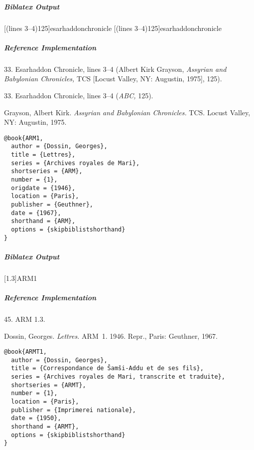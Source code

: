 \documentclass[a4paper]{article}
\newenvironment{biboutput}{%
  \subparagraph{Biblatex Output}
}{\color{black}}
\newenvironment{refimp}{%
  \subparagraph{Reference Implementation}
  \color{reference-colour}
  \rm
}{\par\color{black}}
\begin{document}
\begin{biboutput}
  [(lines 3--4)125]{esarhaddonchronicle}
  [(lines 3--4)125]{esarhaddonchronicle}
\end{biboutput}

\begin{refimp}
  \hspace*{\bibindent}33. Esarhaddon Chronicle, lines 3–4 (Albert Kirk
  Grayson, \emph{Assyrian and Babylonian Chronicles,} TCS [Locust Valley, NY:
  Augustin, 1975], 125).

  \hspace*{\bibindent}33. Esarhaddon Chronicle, lines 3–4 (\emph{ABC,} 125).

  \hangindent\bibindent Grayson, Albert Kirk. \emph{Assyrian and Babylonian
  Chronicles.} TCS. Locust Valley, NY: Augustin, 1975.


\end{refimp}

\medskip

\begin{lstlisting}
@book{ARM1,
  author = {Dossin, Georges},
  title = {Lettres},
  series = {Archives royales de Mari},
  shortseries = {ARM},
  number = {1},
  origdate = {1946},
  location = {Paris},
  publisher = {Geuthner},
  date = {1967},
  shorthand = {ARM},
  options = {skipbiblistshorthand}
}
\end{lstlisting}

\begin{biboutput}
  [1.3]{ARM1}
\end{biboutput}

\begin{refimp}
  \hspace*{\bibindent}45. ARM 1.3.

  \hangindent\bibindent Dossin, Georges. \emph{Lettres.} ARM~1. 1946. Repr.,
  Paris: Geuthner, 1967.

\end{refimp}

\medskip

\begin{lstlisting}
@book{ARMT1,
  author = {Dossin, Georges},
  title = {Correspondance de Šamši-Addu et de ses fils},
  series = {Archives royales de Mari, transcrite et traduite},
  shortseries = {ARMT},
  number = {1},
  location = {Paris},
  publisher = {Imprimerei nationale},
  date = {1950},
  shorthand = {ARMT},
  options = {skipbiblistshorthand}
}
\end{lstlisting}
\end{document}
